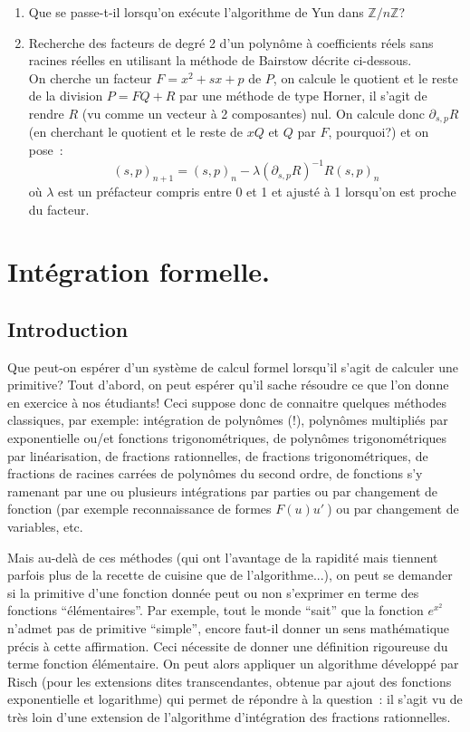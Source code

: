 \documentclass[a4paper,11pt]{article}
\newcommand{\Z}{{\mathbb{Z}}}
\begin{document}
\begin{enumerate}
\item Que se passe-t-il lorsqu'on ex\'ecute l'algorithme de Yun
dans $\Z/n\Z$?
\pagebreak
\item Recherche des facteurs de degré 2 d'un polynôme à coefficients
réels sans racines réelles en utilisant la méthode de Bairstow décrite
ci-dessous.\\
On cherche un facteur $F=x^2+sx+p$ de $P$, on calcule le quotient et le reste
de la division $P=FQ+R$ par une méthode de type Horner, il s'agit de 
rendre $R$ (vu comme un vecteur à 2 composantes) nul. On calcule
donc $\partial_{s,p} R$ (en cherchant le quotient et le reste
de $xQ$ et $Q$ par $F$, pourquoi?) et on pose~:
\[(s,p)_{n+1}=(s,p)_n- \lambda (\partial_{s,p} R)^{-1} R (s,p)_n\]
où $\lambda$ est un préfacteur compris entre 0 et 1 et ajusté à 1 
lorsqu'on est proche du facteur.


\end{enumerate}

\pagebreak

\section{Int\'egration formelle.}\label{sec:intg} 
\subsection{Introduction}
Que peut-on espérer d'un système de calcul formel lorsqu'il s'agit
de calculer une primitive? Tout d'abord, on peut espérer qu'il
sache résoudre ce que l'on donne en exercice à nos étudiants!
Ceci suppose donc de connaitre quelques méthodes classiques, par
exemple: intégration de polynômes (!), polynômes multipliés par exponentielle
ou/et fonctions trigonométriques, de polynômes trigonométriques par
linéarisation, de fractions rationnelles,
de fractions trigonométriques, de fractions de racines carrées de 
polynômes du second ordre, de fonctions s'y ramenant par une ou plusieurs
intégrations par parties ou par
changement de fonction (par exemple reconnaissance de formes $F(u)u'\ $)
ou par changement de variables, etc.

Mais au-delà de ces méthodes (qui ont l'avantage de la rapidité mais
tiennent parfois plus de la
recette de cuisine que de l'algorithme...), on peut se demander 
si la primitive d'une fonction donnée peut ou non s'exprimer en terme 
des fonctions ``élémentaires''. Par exemple, tout le monde ``sait''
que la fonction $e^{x^2}$ n'admet pas de primitive ``simple'', encore
faut-il donner un sens mathématique précis à cette affirmation.
Ceci nécessite de donner une définition rigoureuse du terme fonction
élémentaire. On peut alors appliquer un algorithme développé
par Risch (pour les extensions dites transcendantes, obtenue par ajout
des fonctions exponentielle et logarithme)  
qui permet de répondre à la question~:
il s'agit vu de très loin d'une extension de l'algorithme d'intégration
des fractions rationnelles.
\end{document}
